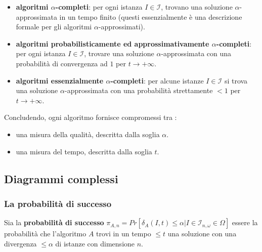 \documentclass{article}
\begin{document}
\begin{itemize}
    \item \textbf{algoritmi $\alpha$-completi}: per ogni istanza $I\in\mathcal{I}$, trovano una soluzione $\alpha$-approssimata
          in un tempo finito (questi essenzialmente è una descrizione formale per gli algoritmi $\alpha$-approssimati).

    \item \textbf{algoritmi probabilisticamente ed approssimativamente $\alpha$-completi}: per ogni istanza $I\in\mathcal{I}$,
          trovare una soluzione $\alpha$-approssimata con una probabilità di convergenza ad $1$ per $t\rightarrow+\infty$.
    \item \textbf{algoritmi essenzialmente $\alpha$-completi}: per alcune istanze $I\in\mathcal{I}$ si trova
          una soluzione $\alpha$-approssimata con una probabilità strettamente $<1$ per $t\rightarrow +\infty$.
\end{itemize}
Concludendo, ogni algoritmo fornisce compromessi tra :
\begin{itemize}
    \item una misura della qualità, descritta dalla soglia $\alpha$.
    \item una misura del tempo, descritta dalla soglia $t$.
\end{itemize}

\subsection{Diagrammi complessi}
\subsubsection{La probabilità di successo}
Sia la \textbf{probabilità di successo} $\pi_{A,n}=Pr[\delta_A(I,t)\leq\alpha | I\in\mathcal{I}_{n,\omega}\in\Omega]$ essere
la probabilità che l'algoritmo $A$ trovi in un tempo $\leq t$ una soluzione con una divergenza $\leq\alpha$
di istanze con dimensione $n$.
\end{document}
